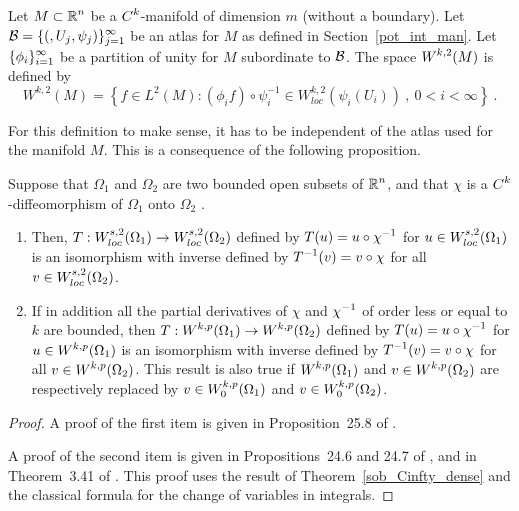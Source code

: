 \begin{defn} \label{sob_manifold}
Let $\displaystyle M\subset \mathbb{R}^n$ be a $\displaystyle C^k$-manifold
of dimension $m$ (without a boundary).  Let
$\displaystyle \mathcal{B} = \{ (,U_j,\psi_j) \}_{j=1}^\infty$ be an atlas for
$M$ as defined in Section~\ref{pot_int_man}.
Let $\displaystyle \{\phi_i\}_{i=1}^\infty$ be a partition of unity
for $M$ subordinate to $\mathcal{B}$.  The space
$\displaystyle W^{k,2}(M)$ is defined by 
\[
W^{k,2}(M) = \left\{ f \in L^2(M) : (\phi_i f) \circ \psi_i^{-1} \in
W^{k,2}_{loc}(\psi_i(U_i)) \ , \ 0<i<\infty \right\} \ .
\]
\end{defn}

For this definition to make sense, it has to be independent of the
atlas used for the manifold $M$.  This is a consequence of the
following proposition.

\begin{prop} \label{sob_cv}
Suppose that $\Omega_1$ and $\Omega_2$ are two bounded open subsets of
$\displaystyle \mathbb{R}^n$, and that $\chi$ is a
$\displaystyle C^k$-diffeomorphism of $\Omega_1$ onto $\Omega_2$ \footnotemark.
\begin{enumerate}
\item Then, $\displaystyle T:W_{loc}^{s,2}(\Omega_1) \to
 W_{loc}^{s,2}(\Omega_2)$ defined by
$\displaystyle T(u) = u \circ \chi^{-1}$ for
$\displaystyle u \in W_{loc}^{s,2}(\Omega_1)$ is an
isomorphism with inverse defined by
$\displaystyle T^{-1}(v) = v \circ \chi$ for all
$\displaystyle v \in W_{loc}^{s,2}(\Omega_2)$.
\item If in addition all the partial derivatives of $\chi$ and
$\displaystyle \chi^{-1}$ of order less or equal to $k$ are bounded, then
$\displaystyle T:W^{k,p}(\Omega_1) \to W^{k,p}(\Omega_2)$ defined by
$\displaystyle T(u) = u \circ \chi^{-1}$ for
$\displaystyle u \in W^{k,p}(\Omega_1)$
is an isomorphism with inverse defined by
$\displaystyle T^{-1}(v) = v \circ \chi$ for all
$\displaystyle v \in W^{k,p}(\Omega_2)$.
This result is also true if 
$\displaystyle W^{k,p}(\Omega_1)$ and $\displaystyle v \in W^{k,p}(\Omega_2)$
are respectively replaced by $\displaystyle v \in W^{k,p}_0(\Omega_1)$
and $\displaystyle v \in W^{k,p}_0(\Omega_2)$.
\end{enumerate}
\end{prop}


\begin{proof}
A proof of the first item is given in Proposition~25.8 of \cite{Tr}.

A proof of the second item is given in Propositions~24.6 and 24.7 of
\cite{Tr}, and in Theorem~3.41 of \cite{Ad}.
This proof uses the result of Theorem~\ref{sob_Cinfty_dense} and the
classical formula for the change of variables in integrals.
\end{proof}

